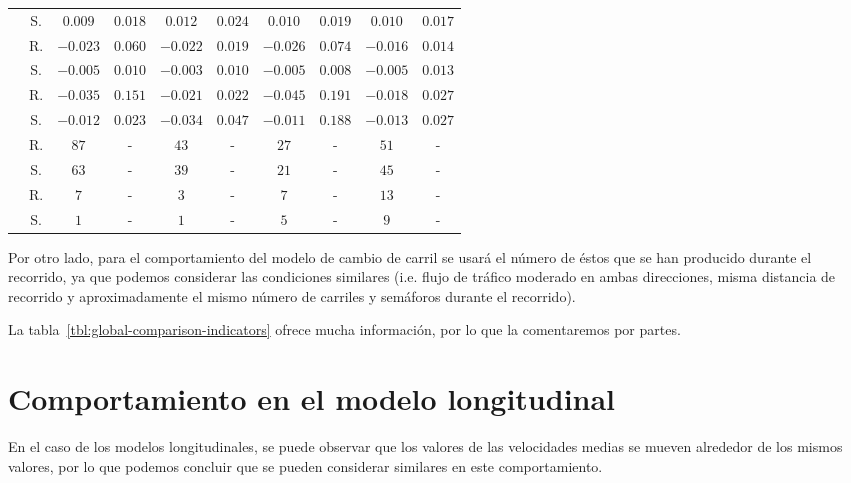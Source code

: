 \begin{table*}[!b]
\begin{tabular}{cccccccccc}
		& S. & $0.009$  & $0.018$  & $0.012$  & $0.024$  & $0.010$  & $0.019$  & $0.010$  & $0.017$  \\
		\rowcolor{black!20} \cellcolor{white} \multirow{2}{*}{\textbf{$JIF$}} & R. & $-0.023$ & $0.060$  & $-0.022$ & $0.019$  & $-0.026$ & $0.074$  & $-0.016$ & $0.014$  \\
		& S. & $-0.005$ & $0.010$  & $-0.003$ & $0.010$  & $-0.005$ & $0.008$  & $-0.005$ & $0.013$  \\
		\rowcolor{black!20} \cellcolor{white} \multirow{2}{*}{\textbf{$JFF$}} & R. & $-0.035$ & $0.151$  & $-0.021$ & $0.022$  & $-0.045$ & $0.191$  & $-0.018$ & $0.027$  \\
		& S. & $-0.012$ & $0.023$  & $-0.034$ & $0.047$  & $-0.011$ & $0.188$  & $-0.013$ & $0.027$  \\
		\rowcolor{black!20} \cellcolor{white} \multirow{2}{*}{\textbf{$LC$}}  & R. & $87$     &    -     & $43$     &    -     & $27$     &    -     & $51$     &    -     \\
		& S. & $63$     &    -     & $39$     &    -     & $21$     &    -     & $45$     &    -     \\
		\rowcolor{black!20} \cellcolor{white} \multirow{2}{*}{\textbf{$RC$}}  & R. & $7$      &    -     & $3$      &    -     & $7$      &    -     & $13$     &    -     \\
		& S. & $1$      &    -     & $1$      &    -     & $5$      &    -     & $9$      &    -     \\
		\bottomrule
	\end{tabular}
\end{table*}

Por otro lado, para el comportamiento del modelo de cambio de carril se usará el número de éstos que se han producido durante el recorrido, ya que podemos considerar las condiciones similares (i.e. flujo de tráfico moderado en ambas direcciones, misma distancia de recorrido y aproximadamente el mismo número de carriles y semáforos durante el recorrido).

La tabla~\ref{tbl:global-comparison-indicators} ofrece mucha información, por lo que la comentaremos por partes.

\section{Comportamiento en el modelo longitudinal}

En el caso de los modelos longitudinales, se puede observar que los valores de las velocidades medias se mueven alrededor de los mismos valores, por lo que podemos concluir que se pueden considerar similares en este comportamiento.

